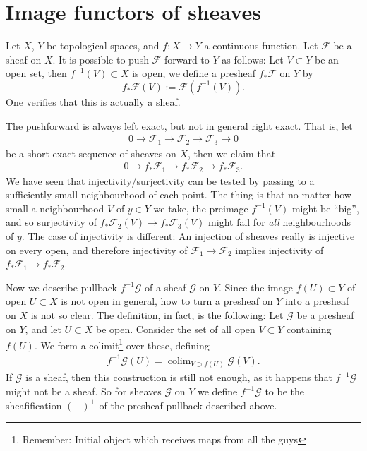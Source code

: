 \documentclass[12pt]{article}
\theoremstyle{plain}
\theoremstyle{definition}
\numberwithin{equation}{section}
\DeclareMathOperator*{\colim}{colim}
\newcommand{\CF}{\mathcal{F}}
\newcommand{\CG}{\mathcal{G}}
\begin{document}
\section{Image functors of sheaves}


Let $X$, $Y$ be topological spaces, and $f : X \rightarrow Y$ a continuous function. Let $\CF$ be a sheaf on $X$. It is possible to push $\CF$ forward to $Y$ as follows: Let $V \subset Y$ be an open set, then $f^{-1}(V) \subset X$ is open, we define a presheaf $f_* \CF$ on $Y$ by
\[
f_*\CF(V) := \CF(f^{-1}(V)).
\]
One verifies that this is actually a sheaf.

The pushforward is always left exact, but not in general right exact. That is, let
\begin{align*}
0 \rightarrow \CF_1 \rightarrow \CF_2 \rightarrow \CF_3 \rightarrow 0
\end{align*}
be a short exact sequence of sheaves on $X$, then we claim that
\begin{align*}
0 \rightarrow f_*\CF_1 \rightarrow f_*\CF_2 \rightarrow f_*\CF_3.
\end{align*}
We have seen that injectivity/surjectivity can be tested by passing to a sufficiently small neighbourhood of each point. The thing is that no matter how small a neighbourhood $V$ of $y \in Y$ we take, the preimage $f^{-1}(V)$ might be ``big'', and so surjectivity of $f_*\CF_2(V) \rightarrow f_*\CF_3(V)$ might fail for \emph{all} neighbourhoods of $y$. The case of injectivity is different: An injection of sheaves really is injective on every open, and therefore injectivity of $\CF_1 \rightarrow \CF_2$ implies injectivity of $f_*\CF_1 \rightarrow f_*\CF_2$.

Now we describe pullback $f^{-1}\CG$ of a sheaf $\CG$ on $Y$. Since the image $f(U) \subset Y$ of open $U \subset X$ is not open in general, how to turn a presheaf on $Y$ into a presheaf on $X$ is not so clear. The definition, in fact, is the following: Let $\CG$ be a presheaf on $Y$, and let $U \subset X$ be open. Consider the set of all open $V \subset Y$ containing $f(U)$. We form a colimit\footnote{Remember: Initial object which receives maps from all the guys} over these, defining
\begin{align}\label{eq:pullback.presheaf}
f^{-1}\CG(U) = \colim_{V \supset f(U)} \CG(V).
\end{align}
If $\CG$ is a sheaf, then this construction is still not enough, as it happens that $f^{-1}\CG$ might not be a sheaf. So for sheaves $\CG$ on $Y$ we define $f^{-1}\CG$ to be the sheafification $(-)^+$ of the presheaf pullback described above.
\end{document}
